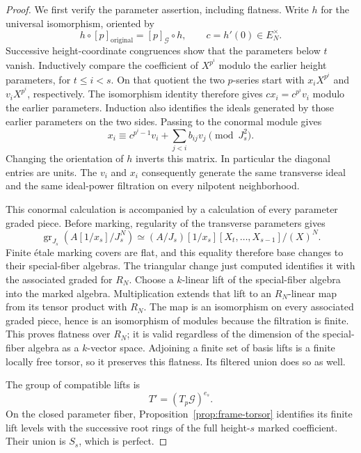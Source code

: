 \begin{proof}
We first verify the parameter assertion, including flatness.  Write
$h$ for the universal isomorphism, oriented by
\[
 h\circ[p]_{\mathrm{original}}=[p]_{\mathcal G}\circ h,
 \qquad c=h'(0)\in E_N^\times.
\]
Successive height-coordinate congruences show that the parameters
below $t$ vanish.  Inductively compare the coefficient of $X^{p^i}$
modulo the earlier height parameters, for $t\leq i<s$.  On that
quotient the two $p$-series start with $x_iX^{p^i}$ and
$v_iX^{p^i}$, respectively.  The isomorphism identity therefore
gives $cx_i=c^{p^i}v_i$ modulo the earlier parameters.  Induction
also identifies the ideals generated by those earlier parameters
on the two sides.  Passing to the conormal module gives
\[
 x_i\equiv c^{p^i-1}v_i+\sum_{j<i}b_{ij}v_j\pmod{J_s^2}.
\]
Changing the orientation of $h$ inverts this matrix.  In particular
the diagonal entries are units.  The $v_i$ and $x_i$ consequently
generate the same transverse ideal and the same ideal-power
filtration on every nilpotent neighborhood.

This conormal calculation is accompanied by a calculation of every
parameter graded piece.  Before marking, regularity of the transverse
parameters gives
\[
 \operatorname{gr}_{J_s}(A[1/x_s]/J_s^N)
  \simeq (A/J_s)[1/x_s][X_t,\ldots,X_{s-1}]/(X)^N.
\]
Finite \'etale marking covers are flat, and this equality therefore
base changes to their special-fiber algebras.  The triangular change
just computed identifies it with the associated graded for $R_N$.
Choose a $k$-linear lift of the special-fiber algebra into the marked
algebra.  Multiplication extends that lift to an $R_N$-linear map
from its tensor product with $R_N$.  The map is an isomorphism on
every associated graded piece, hence is an isomorphism of modules
because the filtration is finite.  This proves flatness over $R_N$;
it is valid regardless of the dimension of the special-fiber algebra
as a $k$-vector space.  Adjoining a finite set of basis lifts is a
finite locally free torsor, so it preserves this flatness.  Its
filtered union does so as well.

The group of compatible lifts is
\begin{equation}
 \label{eq:boundary-relative-translations}
 T'=(T_p\mathcal G)^{e_s}.
\end{equation}
On the closed parameter fiber, Proposition~\ref{prop:frame-torsor}
identifies its finite lift levels with the successive root rings of
the full height-$s$ marked coefficient.  Their union is $S_s$, which
is perfect.


\end{proof}
